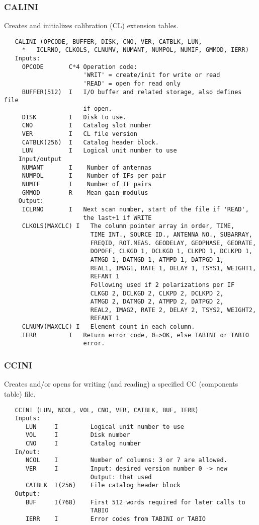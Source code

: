 \subsubsection{CALINI}
Creates and initializes calibration (CL) extension tables.
\begin{verbatim}
   CALINI (OPCODE, BUFFER, DISK, CNO, VER, CATBLK, LUN,
     *   ICLRNO, CLKOLS, CLNUMV, NUMANT, NUMPOL, NUMIF, GMMOD, IERR)
   Inputs:
     OPCODE       C*4 Operation code:
                      'WRIT' = create/init for write or read
                      'READ' = open for read only
     BUFFER(512)  I   I/O buffer and related storage, also defines file
                      if open.
     DISK         I   Disk to use.
     CNO          I   Catalog slot number
     VER          I   CL file version
     CATBLK(256)  I   Catalog header block.
     LUN          I   Logical unit number to use
    Input/output
     NUMANT       I    Number of antennas
     NUMPOL       I    Number of IFs per pair
     NUMIF        I    Number of IF pairs
     GMMOD        R    Mean gain modulus
    Output:
     ICLRNO       I   Next scan number, start of the file if 'READ',
                      the last+1 if WRITE
     CLKOLS(MAXCLC) I   The column pointer array in order, TIME,
                        TIME INT., SOURCE ID., ANTENNA NO., SUBARRAY,
                        FREQID, ROT.MEAS. GEODELAY, GEOPHASE, GEORATE,
                        DOPOFF, CLKGD 1, DCLKGD 1, CLKPD 1, DCLKPD 1,
                        ATMGD 1, DATMGD 1, ATMPD 1, DATPGD 1,
                        REAL1, IMAG1, RATE 1, DELAY 1, TSYS1, WEIGHT1,
                        REFANT 1
                        Following used if 2 polarizations per IF
                        CLKGD 2, DCLKGD 2, CLKPD 2, DCLKPD 2,
                        ATMGD 2, DATMGD 2, ATMPD 2, DATPGD 2,
                        REAL2, IMAG2, RATE 2, DELAY 2, TSYS2, WEIGHT2,
                        REFANT 1
     CLNUMV(MAXCLC) I   Element count in each column.
     IERR         I   Return error code, 0=>OK, else TABINI or TABIO
                      error.
\end{verbatim}

\subsubsection{CCINI}
Creates and/or opens for writing (and reading) a specified
CC (components table) file.
\begin{verbatim}
   CCINI (LUN, NCOL, VOL, CNO, VER, CATBLK, BUF, IERR)
   Inputs:
      LUN     I         Logical unit number to use
      VOL     I         Disk number
      CNO     I         Catalog number
   In/out:
      NCOL    I         Number of columns: 3 or 7 are allowed.
      VER     I         Input: desired version number 0 -> new
                        Output: that used
      CATBLK  I(256)    File catalog header block
   Output:
      BUF     I(768)    First 512 words required for later calls to
                        TABIO
      IERR    I         Error codes from TABINI or TABIO
\end{verbatim}

